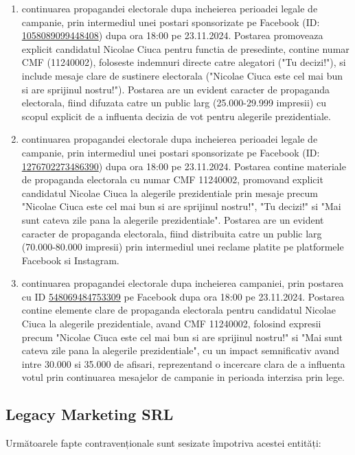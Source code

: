 \documentclass[a4paper,12pt]{article}
\begin{document}
\begin{enumerate}[leftmargin=*, label=\arabic*.)]
    \item continuarea propagandei electorale dupa incheierea perioadei legale de campanie, prin intermediul unei postari sponsorizate pe Facebook (ID: \href{https://www.facebook.com/ads/library/?id=1058089099448408}{1058089099448408}) dupa ora 18:00 pe 23.11.2024. Postarea promoveaza explicit candidatul Nicolae Ciuca pentru functia de presedinte, contine numar CMF (11240002), foloseste indemnuri directe catre alegatori ("Tu decizi!"), si include mesaje clare de sustinere electorala ("Nicolae Ciuca este cel mai bun si are sprijinul nostru!"). Postarea are un evident caracter de propaganda electorala, fiind difuzata catre un public larg (25.000-29.999 impresii) cu scopul explicit de a influenta decizia de vot pentru alegerile prezidentiale.
    \item continuarea propagandei electorale dupa incheierea perioadei legale de campanie, prin intermediul unei postari sponsorizate pe Facebook (ID: \href{https://www.facebook.com/ads/library/?id=1276702273486390}{1276702273486390}) dupa ora 18:00 pe 23.11.2024. Postarea contine materiale de propaganda electorala cu numar CMF 11240002, promovand explicit candidatul Nicolae Ciuca la alegerile prezidentiale prin mesaje precum "Nicolae Ciuca este cel mai bun si are sprijinul nostru!", "Tu decizi!" si "Mai sunt cateva zile pana la alegerile prezidentiale". Postarea are un evident caracter de propaganda electorala, fiind distribuita catre un public larg (70.000-80.000 impresii) prin intermediul unei reclame platite pe platformele Facebook si Instagram.
    \item continuarea propagandei electorale dupa incheierea campaniei, prin postarea cu ID \href{https://www.facebook.com/ads/library/?id=548069484753309}{548069484753309} pe Facebook dupa ora 18:00 pe 23.11.2024. Postarea contine elemente clare de propaganda electorala pentru candidatul Nicolae Ciuca la alegerile prezidentiale, avand CMF 11240002, folosind expresii precum "Nicolae Ciuca este cel mai bun si are sprijinul nostru!" si "Mai sunt cateva zile pana la alegerile prezidentiale", cu un impact semnificativ avand intre 30.000 si 35.000 de afisari, reprezentand o incercare clara de a influenta votul prin continuarea mesajelor de campanie in perioada interzisa prin lege.
\end{enumerate}

\vspace{0.5cm}

\subsection{Legacy Marketing SRL}
Următoarele fapte contravenționale sunt sesizate împotriva acestei entități:
\end{document}
